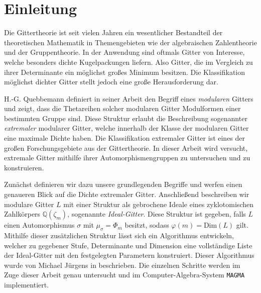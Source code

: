 \documentclass[12pt,a4paper,halfparskip,headsepline,bibtotocnumbered]{scrreprt}
\theoremstyle{nummermitklammern}
\theoremstyle{nonumberbreak}
\newcommand{\Q}{\mathbb{Q}}
\begin{document}
\chapter{Einleitung}
Die Gittertheorie ist seit vielen Jahren ein wesentlicher Bestandteil der theoretischen Mathematik in Themengebieten wie der algebraischen Zahlentheorie und der Gruppentheorie. In der Anwendung sind oftmals Gitter von Interesse, welche besonders dichte Kugelpackungen liefern. Also Gitter, die im Vergleich zu ihrer Determinante ein möglichst großes Minimum besitzen. Die Klassifikation möglichst dichter Gitter stellt jedoch eine große Herausforderung dar.\par
H.-G. Quebbemann definiert in seiner Arbeit \cite{quebbemann} den Begriff eines \textit{modularen} Gitters und zeigt, dass die Thetareihen solcher modularen Gitter Modulformen einer bestimmten Gruppe sind. Diese Struktur erlaubt die Beschreibung sogenannter \textit{extremaler} modularer Gitter, welche innerhalb der Klasse der modularen Gitter eine maximale Dichte haben. Die Klassifikation extremaler Gitter ist eines der großen Forschungsgebiete aus der Gittertheorie. In dieser Arbeit wird versucht, extremale Gitter mithilfe ihrer Automorphismengruppen zu untersuchen und zu konstruieren.\par
Zunächst definieren wir dazu unsere grundlegenden Begriffe und werfen einen genaueren Blick auf die Dichte extremaler Gitter. Anschließend beschreiben wir modulare Gitter $L$ mit einer Struktur als gebrochene Ideale eines zyklotomischen Zahlkörpers $\Q(\zeta_m)$, sogenannte \textit{Ideal-Gitter}. Diese Struktur ist gegeben, falls $L$ einen Automorphismus $\sigma$ mit $\mu_\sigma = \Phi_m$ besitzt, sodass $\varphi(m) = \text{Dim}(L)$ gilt. Mithilfe dieser zusätzlichen Struktur lässt sich ein Algorithmus entwickeln, welcher zu gegebener Stufe, Determinante und Dimension eine vollständige Liste der Ideal-Gitter mit den festgelegten Parametern konstruiert. Dieser Algorithmus wurde von Michael Jürgens in \cite{juergens} beschrieben. Die einzelnen Schritte werden im Zuge dieser Arbeit genau untersucht und im Computer-Algebra-System \texttt{MAGMA} implementiert.\par
\end{document}
